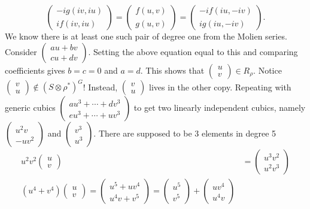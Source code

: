 \begin{ex}
	\[
	\begin{pmatrix} -ig(iv,iu) \\ if(iv,iu) \end{pmatrix}= \begin{pmatrix} f(u,v) \\ g(u,v) \end{pmatrix}= \begin{pmatrix} -if(iu,-iv) \\ ig(iu,-iv) \end{pmatrix}.
	\] %
We know there is at least one such pair of degree one from the Molien series. Consider $\begin{pmatrix} au+bv \\ cu+dv \end{pmatrix}$. Setting the above equation equal to this and comparing coefficients gives $b=c=0$ and $a=d$. This shows that $\begin{pmatrix} u \\ v \end{pmatrix} \in R_\rho$. Notice $\begin{pmatrix} v \\ u \end{pmatrix} \notin (S \otimes \rho^*)^G$! Instead, $\begin{pmatrix} v \\ u \end{pmatrix}$ lives in the other copy. Repeating with generic cubics $\begin{pmatrix} au^3+\cdots+dv^3 \\ eu^3+\cdots+uv^3 \end{pmatrix}$ to get two linearly independent cubics, namely $\begin{pmatrix} u^2v \\ -uv^2 \end{pmatrix}$ and $\begin{pmatrix} v^3 \\ u^3 \end{pmatrix}$. There are supposed to be 3 elements in degree 5
	\[
	\begin{split}
	u^2v^2 \begin{pmatrix} u \\ v \end{pmatrix}&= \begin{pmatrix} u^3v^2 \\ u^2v^3 \end{pmatrix} \\
	(u^4+v^4) \begin{pmatrix} u \\ v \end{pmatrix}= \begin{pmatrix} u^5+uv^4 \\ u^4v+v^5 \end{pmatrix}= \begin{pmatrix} u^5 \\ v^5 \end{pmatrix} + \begin{pmatrix} uv^4 \\ u^4v \end{pmatrix}

\end{split}\]
\end{ex}
